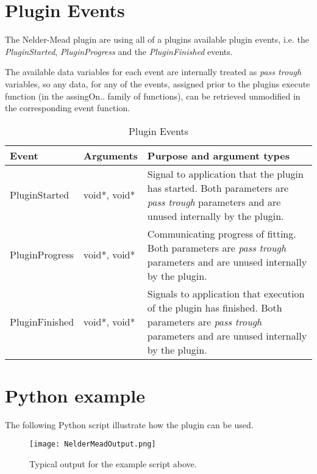 \section{Plugin Events}
The Nelder-Mead plugin are using all of a plugins available plugin events, i.e. the \emph{PluginStarted}, \emph{PluginProgress} and the \emph{PluginFinished} events.

The available data variables for each event are internally treated as \emph{pass trough} variables, so any data, for any of the events, assigned prior to
the plugins execute function (in the assingOn.. family of functions), can be retrieved unmodified in the corresponding event function.

\begin{table}[ht]
\centering %
\begin{tabular}{l l p{9cm}}

Event & Arguments & Purpose and argument types \\ [0.5ex] %
\hline %
PluginStarted  	& 	void*, void*  & Signal to application that the plugin has started. Both parameters are \emph{pass trough} parameters and are unused internally by the plugin.\\[0.5ex]
PluginProgress	& 	void*, void*  & Communicating progress of fitting. Both parameters are \emph{pass trough} parameters and are unused internally by the plugin. \\[0.5ex]
PluginFinished	& 	void*, void*  & Signals to application that execution of the plugin has finished. Both parameters are \emph{pass trough} parameters and are unused internally by the plugin.\\

\hline %
\end{tabular}
\caption{Plugin Events}
\label{table:nmPluginEvents}
\end{table}

\section{Python example}
The following Python script illustrate how the plugin can be used.

\begin{singlespace}

\end{singlespace}

\begin{figure}[ht]
\centering
\texttt{[image: NelderMeadOutput.png]}
\caption{Typical output for the example script above.}
\label{fig:nmFig}
\end{figure}






